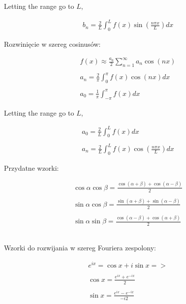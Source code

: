\documentclass[11pt]{article}
\begin{document}
\begin{enumerate}
Letting the range go to $L$,

\begin{align*}
    b_{n} = \frac{2}{L} \int_{0}^{L} f(x) \sin (\frac{n \pi x}{L}) dx
\end{align*}


Rozwinięcie w szereg cosinusów:

\begin{align*}
    f(x) \approx \frac{a_{0}}{2} \sum_{n=1}^{\infty} a_{n} \cos(nx) \\ \\
    a_{n} = \frac{2}{\pi} \int_{0}^{\pi} f(x)\cos(nx) dx \\ \\
    a_{0} = \frac{1}{\pi} \int_{-\pi}^{\pi} f(x) dx
\end{align*}

Letting the range go to $L$,

\begin{align*}
    a_{0} = \frac{2}{L} \int_{0}^{L} f(x) dx \\\\
    a_{n} = \frac{2}{L} \int_{0}^{L} f(x) \cos(\frac{n \pi x}{L})dx
\end{align*}

Przydatne wzorki:

\begin{align*}
    \cos\alpha \cos\beta = \frac{\cos(\alpha + \beta)+\cos(\alpha - \beta)}{2} \\ \\
    \sin\alpha \cos\beta = \frac{\sin(\alpha + \beta)+\sin(\alpha - \beta)}{2} \\\\
    \sin\alpha \sin\beta = \frac{\cos(\alpha - \beta)+\cos(\alpha + \beta)}{2} \\\\\\
\end{align*}





Wzorki do rozwijania w szereg Fouriera zespolony:

\begin{align*}
     e^{ix}=\cos x + i\sin x => \\\\
     \cos x = \frac{e^{ix} + e^{-ix}}{2}\\\\
     \sin x = \frac{e^{ix} - e^{-ix}}{-i2}\\\\
\end{align*}


\end{enumerate}
\end{document}
